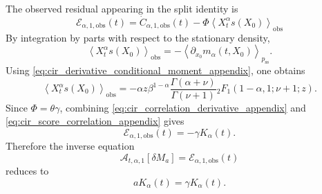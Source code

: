 \documentclass[11pt,twoside,fleqn]{article}
\begin{document}
The observed residual appearing in the split identity is
\begin{equation}
    \mathcal{E}_{\alpha,1,\mathrm{obs}}(t)
    =
    \dot C_{\alpha,1,\mathrm{obs}}(t)
    -
    \Phi
    \left\langle
        X_t^\alpha s(X_0)
    \right\rangle_{\mathrm{obs}}
    \label{eq:cir_residual_def_appendix}
\end{equation}
By integration by parts with respect to the stationary density,
\begin{equation}
    \left\langle
        X_t^\alpha s(X_0)
    \right\rangle_{\mathrm{obs}}
    =
    -
    \left\langle
        \partial_{x_0}m_\alpha(t,X_0)
    \right\rangle_{p_{\mathrm{ss}}}.
    \label{eq:cir_score_corr_integration_by_parts_appendix}
\end{equation}
Using \eqref{eq:cir_derivative_conditional_moment_appendix}, one obtains
\begin{equation}
    \left\langle
        X_t^\alpha s(X_0)
    \right\rangle_{\mathrm{obs}}
    =
    -
    \alpha z
    \beta^{1-\alpha}
    \frac{\Gamma(\alpha+\nu)}{\Gamma(\nu+1)}
    {}_2F_1\!\left(
        1-\alpha,1;\nu+1;z
    \right).
    \label{eq:cir_score_correlation_appendix}
\end{equation}
Since \(\Phi=\theta\gamma\), combining
\eqref{eq:cir_correlation_derivative_appendix}
and
\eqref{eq:cir_score_correlation_appendix}
gives
\begin{equation}
    \mathcal{E}_{\alpha,1,\mathrm{obs}}(t)
    =
    -\gamma K_\alpha(t).
    \label{eq:cir_residual_reduction_appendix}
\end{equation}
Therefore the inverse equation
\begin{equation}
    \mathcal{A}_{t,\alpha,1}[\delta M_a]
    =
    \mathcal{E}_{\alpha,1,\mathrm{obs}}(t)
    \label{eq:cir_inverse_equation_appendix}
\end{equation}
reduces to
\begin{equation}
    aK_\alpha(t)=\gamma K_\alpha(t).
    \label{eq:cir_inverse_scalar_equation_appendix}
\end{equation}
\end{document}
